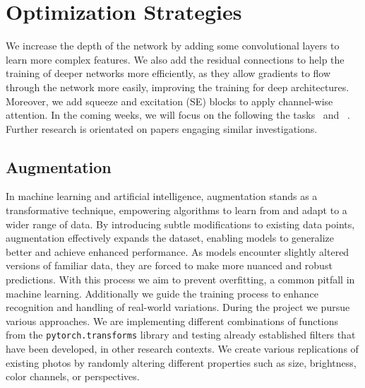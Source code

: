 \section{Optimization Strategies}
\label{sec:optim}
We increase the depth of the network by adding some convolutional layers to learn more complex features. 
We also add the residual connections to help the training of deeper networks more efficiently, 
as they allow gradients to flow through the network more easily, improving the training for deep architectures. 
Moreover, 
we add squeeze and excitation (SE) blocks to apply channel-wise attention. 
In the coming weeks, 
we will focus on the following the tasks~ and ~.
Further research is orientated on papers engaging similar investigations.

\subsection{Augmentation}
\label{sec:optim:aug}
In machine learning and artificial intelligence, 
augmentation stands as a transformative technique, 
empowering algorithms to learn from and adapt to a wider range of data. 
By introducing subtle modifications to existing data points, 
augmentation effectively expands the dataset, 
enabling models to generalize better and achieve enhanced performance.
As models encounter slightly altered versions of familiar data, 
they are forced to make more nuanced and robust predictions. 
With this process we aim to prevent overfitting, 
a common pitfall in machine learning. 
Additionally we guide the training process to enhance recognition and handling of real-world variations.
During the project we pursue various approaches. 
We are implementing different combinations of functions from the \texttt{pytorch.transforms} library and testing already established filters that have been developed, in other research contexts. 
We create various replications of existing photos by randomly altering different properties such as size, brightness, color channels, or perspectives.

